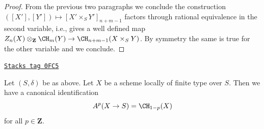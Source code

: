 \begin{proof}
\medskip\noindent
From the previous two paragraphs we conclude
the construction $([X'], [Y']) \mapsto [X' \times_S Y']_{n + m - 1}$
factors through rational equivalence in the second variable, i.e.,
gives a well defined map
$Z_n(X) \otimes_{\mathbf{Z}} \CH_m(Y) \to \CH_{n + m - 1}(X \times_S Y)$.
By symmetry the same is true for the other variable and we conclude.
\end{proof}

\begin{lemma}
\label{chow-lemma-chow-cohomology-towards-base-dim-1}
\href{https://stacks.math.columbia.edu/tag/0FC5}{\texttt{Stacks tag 0FC5}}

Let $(S, \delta)$ be as above. Let $X$ be a scheme locally of finite type
over $S$. Then we have a canonical identification
$$
A^p(X \to S) = \CH_{1 - p}(X)
$$
for all $p \in \mathbf{Z}$.
\end{lemma}

